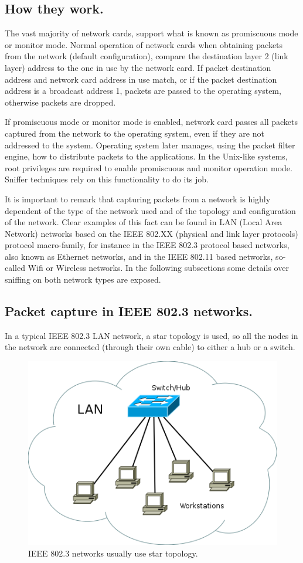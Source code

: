 \documentclass[thesis=M,english]{FITthesis}[2011/07/15]
\begin{document}
\subsection{How they work.}
The vast majority of network cards, support what is known as promiscuous mode or monitor mode. Normal operation of network cards when obtaining packets from the network (default configuration), compare the destination layer 2 (link layer) address to the one in use by the network card. If packet destination address and network card address in use match, or if the packet destination address is a broadcast address 1, packets are passed to the operating system, otherwise packets are dropped.

If promiscuous mode or monitor mode is enabled, network card passes all packets captured from the network to the operating system, even if they are not addressed to the system. Operating system later manages, using the packet filter engine, how to distribute packets to the applications. In the Unix-like systems, root privileges are required to enable promiscuous and monitor operation mode. Sniffer techniques rely on this functionality to do its job.

It is important to remark that capturing packets from a network is highly dependent of the type of the network used and of the topology and configuration of the network. Clear examples of this fact can be found in LAN (Local Area Network) networks based on the IEEE 802.XX (physical and link layer protocols) protocol macro-family, for instance in the IEEE 802.3 protocol based networks, also known as Ethernet networks, and in the IEEE 802.11 based networks, so-called Wifi or Wireless networks. In the following subsections some details over sniffing on both network types are exposed.

\subsection{Packet capture in IEEE 802.3 networks.}
In a typical IEEE 802.3 LAN network, a star topology is used, so all the nodes in the network are connected (through their own cable) to either a hub or a switch.
\begin{figure}[h]
\centering
\includegraphics[scale=0.45]{images/IEEE802_3_LAN.png}
\caption{IEEE 802.3 networks usually use star topology.}
\label{fig:ieee802.3star_topology}
\end{figure}
\end{document}
